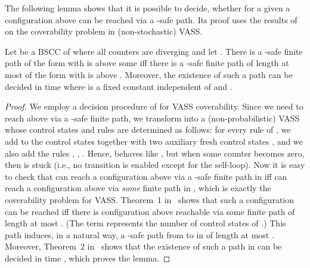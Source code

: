 The following lemma shows that it is possible to decide, whether for a given  a configuration above  can be reached via a -safe path. Its proof uses the results of~\cite{BG:VASS-coverability} on the coverability problem in (non-stochastic) VASS.

\begin{lemma}
\label{lem:cover-short-path}
 Let  be a BSCC of  where all counters are diverging and let . There is a -safe finite path of the form  with  is above some  iff there is a -safe finite path of length at most  of the form  with  is above . Moreover, the existence of such a path can be decided in time  where  is a fixed constant independent of  and .
\end{lemma}
\begin{proof}
  We employ a decision procedure of \cite{BG:VASS-coverability} for
  VASS coverability. Since we need to reach  above  via
  a -safe finite path, we transform  into a
  (non-probabilistic) VASS  whose control states and rules are
  determined as follows: for every rule 
  of , we add to  the control states  together with two
  auxiliary fresh control states , and we also add the rules
  , ,
  . Hence,  behaves like , but when
  some counter becomes zero, then  is stuck (i.e., no transition
  is enabled except for the self-loop). Now it is easy to check that
   can reach a configuration  above  via a
  -safe finite path in  iff  can reach a
  configuration  above  via \emph{some} finite path in
  , which is exactly the coverability problem for VASS. 
  Theorem~1 in~\cite{BG:VASS-coverability} shows that such a
  configuration can be reached iff there is configuration 
  above  reachable via some finite path of length at most . (The term 
  represents the number of control states of .) This path
  induces, in a natural way, a -safe path from  to
   in  of length at most . Moreover, Theorem~2
  in~\cite{BG:VASS-coverability} shows that the existence of such a
  path in  can be decided in time
  , which proves
  the lemma. \end{proof}



